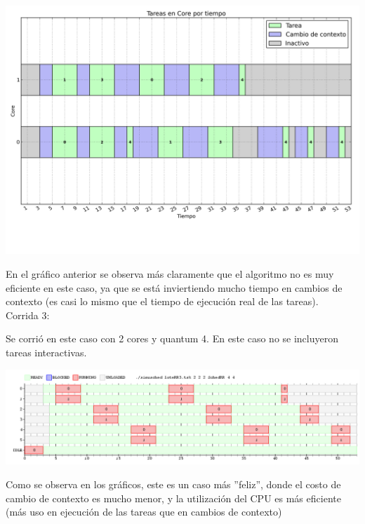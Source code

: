 \begin{center}
\includegraphics[scale=0.4]{graficos/out_cores_timeline.png}
\end{center}

En el gráfico anterior se observa más claramente que el algoritmo no es muy eficiente en este caso, ya que se está inviertiendo mucho tiempo en cambios de contexto (es casi lo mismo que el tiempo de ejecución real de las tareas).\\

\noindent
Corrida 3:


Se corrió en este caso con 2 cores y quantum 4. En este caso no se incluyeron tareas interactivas.

\begin{center}
\includegraphics[scale=0.4]{graficos/rr_loteRR3.png}
\end{center}

Como se observa en los gráficos, este es un caso más ''feliz'', donde el costo de cambio de contexto es mucho menor, y la utilización del CPU es más eficiente (más uso en ejecución de las tareas que en cambios de contexto)

